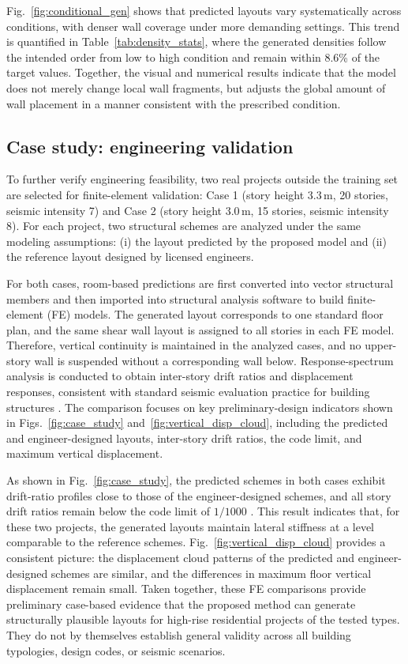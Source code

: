 Fig.~\ref{fig:conditional_gen} shows that predicted layouts vary systematically across conditions, with denser wall coverage under more demanding settings. This trend is quantified in Table~\ref{tab:density_stats}, where the generated densities follow the intended order from low to high condition and remain within 8.6\% of the target values. Together, the visual and numerical results indicate that the model does not merely change local wall fragments, but adjusts the global amount of wall placement in a manner consistent with the prescribed condition.

\subsection{Case study: engineering validation}
\label{subsec:case_study}

To further verify engineering feasibility, two real projects outside the training set are selected for finite-element validation: Case 1 (story height 3.3\,m, 20 stories, seismic intensity 7) and Case 2 (story height 3.0\,m, 15 stories, seismic intensity 8). For each project, two structural schemes are analyzed under the same modeling assumptions: (i) the layout predicted by the proposed model and (ii) the reference layout designed by licensed engineers.

For both cases, room-based predictions are first converted into vector structural members and then imported into structural analysis software to build finite-element (FE) models. The generated layout corresponds to one standard floor plan, and the same shear wall layout is assigned to all stories in each FE model. Therefore, vertical continuity is maintained in the analyzed cases, and no upper-story wall is suspended without a corresponding wall below. Response-spectrum analysis is conducted to obtain inter-story drift ratios and displacement responses, consistent with standard seismic evaluation practice for building structures \cite{GB500112010Code2016,qianDesignTallBuilding2018}. The comparison focuses on key preliminary-design indicators shown in Figs.~\ref{fig:case_study} and~\ref{fig:vertical_disp_cloud}, including the predicted and engineer-designed layouts, inter-story drift ratios, the code limit, and maximum vertical displacement.

As shown in Fig.~\ref{fig:case_study}, the predicted schemes in both cases exhibit drift-ratio profiles close to those of the engineer-designed schemes, and all story drift ratios remain below the code limit of $1/1000$ \cite{GB500112010Code2016}. This result indicates that, for these two projects, the generated layouts maintain lateral stiffness at a level comparable to the reference schemes. Fig.~\ref{fig:vertical_disp_cloud} provides a consistent picture: the displacement cloud patterns of the predicted and engineer-designed schemes are similar, and the differences in maximum floor vertical displacement remain small. Taken together, these FE comparisons provide preliminary case-based evidence that the proposed method can generate structurally plausible layouts for high-rise residential projects of the tested types. They do not by themselves establish general validity across all building typologies, design codes, or seismic scenarios.
